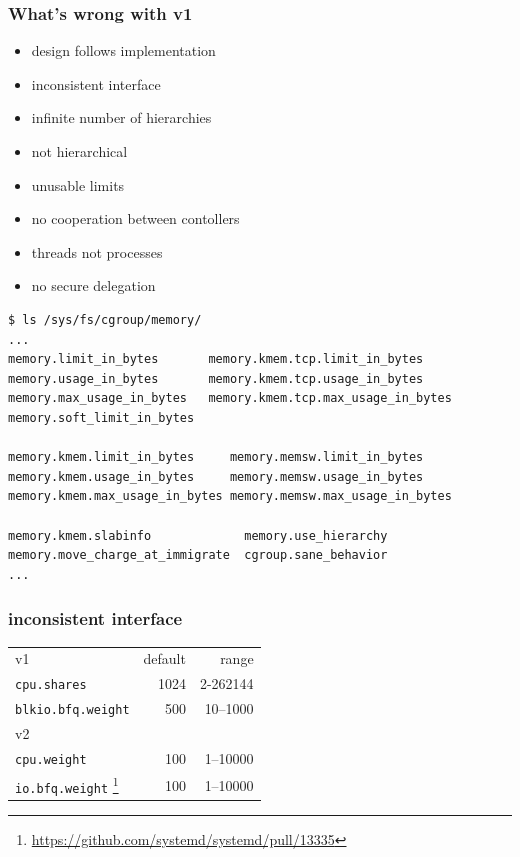 \documentclass[serif]{beamer}
\begin{document}
\begin{frame}
  \frametitle{What's wrong with v1}

  \begin{itemize}
  \item design follows implementation \pause
  \item inconsistent interface \pause
  \item infinite number of hierarchies \pause
  \item not hierarchical \pause
  \item unusable limits \pause
  \item no cooperation between contollers\pause
  \item threads not processes \pause
  \item no secure delegation
  \end{itemize}
\end{frame}

\begin{frame}[fragile]
\begin{adjustwidth}{-1.5em}{-1.5em}
\begin{verbatim}
$ ls /sys/fs/cgroup/memory/
...
memory.limit_in_bytes       memory.kmem.tcp.limit_in_bytes
memory.usage_in_bytes       memory.kmem.tcp.usage_in_bytes
memory.max_usage_in_bytes   memory.kmem.tcp.max_usage_in_bytes
memory.soft_limit_in_bytes

memory.kmem.limit_in_bytes     memory.memsw.limit_in_bytes
memory.kmem.usage_in_bytes     memory.memsw.usage_in_bytes
memory.kmem.max_usage_in_bytes memory.memsw.max_usage_in_bytes

memory.kmem.slabinfo             memory.use_hierarchy
memory.move_charge_at_immigrate  cgroup.sane_behavior
...
\end{verbatim}
\end{adjustwidth}
\end{frame}

\begin{frame}[fragile]
  \frametitle{inconsistent interface}

  \begin{tabular}{l|rr}
    v1                        & default & range           \\
    \texttt{cpu.shares}       & 1024 & 2-262144 \\
    \texttt{blkio.bfq.weight} & 500  & 10–1000 \\
    \hline
    v2           \\
    \texttt{cpu.weight}       & 100  & 1–10000 \\
    \texttt{io.bfq.weight}%
    \footnote{\textcolor{gray}{\url{https://github.com/systemd/systemd/pull/13335}}}
    & 100  & 1–10000
  \end{tabular}
\end{frame}
\end{document}
